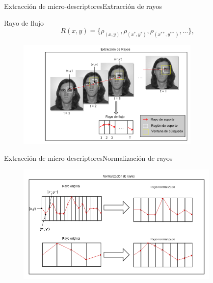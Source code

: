 \documentclass{beamer}
\begin{document}
        
        \begin{frame}{Extracción de micro-descriptores}{Extracción de rayos}
			\begin{block}{Rayo de flujo}
				\begin{equation}
					R(x,y)	 = \{\rho_{(x,y)}, \rho_{(x^*,y^*)}, \rho_{(x^{**},y^{**})}, ... \},
				\end{equation}
		    \end{block}			
			
			\begin{figure}[bt]
        			\centering
                \includegraphics[width=9cm]{imagenes/Extraccion_de_rayos.png}
            \end{figure}             
            
            
        \end{frame}
       

        \begin{frame}{Extracción de micro-descriptores}{Normalización de rayos}
            \begin{figure}[bt]
        		\centering
                \includegraphics[width=10cm]{imagenes/normalizacion_de_rayos.png}
            \end{figure}
        \end{frame}
    
\end{document}

